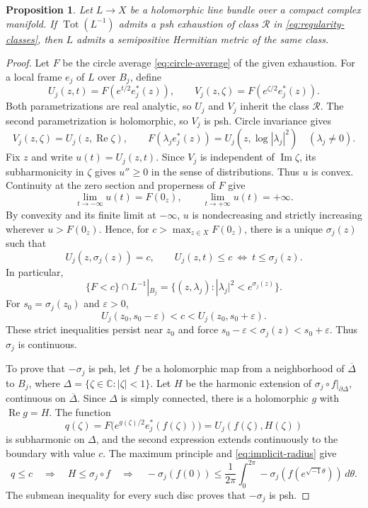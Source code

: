 \documentclass[11pt]{amsart}
\newtheorem{proposition}[theorem]{Proposition}
\theoremstyle{definition}
\theoremstyle{remark}
\numberwithin{equation}{section}
\newcommand{\Tot}{\operatorname{Tot}}
\begin{document}
\begin{proposition}\label{prop:radius}
Let $L\to X$ be a holomorphic line bundle over a compact complex
manifold. If $\Tot(L^{-1})$ admits a psh exhaustion of class
$\mathcal R$ in \eqref{eq:regularity-classes}, then $L$ admits a
semipositive Hermitian metric of the same class.
\end{proposition}
\begin{proof}
Let $F$ be the circle average \eqref{eq:circle-average} of the given
exhaustion. For a local frame $e_j$ of $L$ over $B_j$, define
\[
 U_j(z,t)=F(e^{t/2}e_j^*(z)),\qquad
 V_j(z,\zeta)=F(e^{\zeta/2}e_j^*(z)).
\]
Both parametrizations are real analytic, so $U_j$ and $V_j$
inherit the class $\mathcal R$. The second parametrization is
holomorphic, so $V_j$ is psh. Circle invariance gives
\[
 V_j(z,\zeta)=U_j(z,\operatorname{Re}\zeta),\qquad
 F(\lambda_j e_j^*(z))=U_j(z,\log|\lambda_j|^2)
 \quad(\lambda_j\ne0).
\]
Fix $z$ and write $u(t)=U_j(z,t)$. Since $V_j$ is independent of
$\operatorname{Im}\zeta$, its subharmonicity in $\zeta$ gives
$u''\ge0$ in the sense of distributions. Thus $u$ is convex.
Continuity at the zero section and
properness of $F$ give
\begin{equation}\label{eq:radial-limits}
 \lim_{t\to-\infty}u(t)=F(0_z),\qquad
 \lim_{t\to+\infty}u(t)=+\infty.
\end{equation}
By convexity and its finite limit at $-\infty$, $u$ is
nondecreasing and strictly increasing wherever $u>F(0_z)$.
Hence, for $c>\max_{z\in X}F(0_z)$, there is a unique
$\sigma_j(z)$ such that
\begin{equation}\label{eq:implicit-radius}
 U_j(z,\sigma_j(z))=c,
 \qquad U_j(z,t)\le c\ \Longleftrightarrow\ t\le\sigma_j(z).
\end{equation}
In particular,
\begin{equation}\label{eq:radius-sublevel}
 \{F<c\}\cap L^{-1}|_{B_j}
 =\{(z,\lambda_j):|\lambda_j|^2<e^{\sigma_j(z)}\}.
\end{equation}
For $s_0=\sigma_j(z_0)$ and $\varepsilon>0$,
\[
 U_j(z_0,s_0-\varepsilon)<c<U_j(z_0,s_0+\varepsilon).
\]
These strict inequalities persist near $z_0$ and force
$s_0-\varepsilon<\sigma_j(z)<s_0+\varepsilon$. Thus $\sigma_j$
is continuous.

To prove that $-\sigma_j$ is psh, let $f$ be a holomorphic map from a
neighborhood of $\overline\Delta$ to $B_j$, where $\Delta=\{\zeta\in\mathbb C:|\zeta|< 1\}$. Let $H$ be the harmonic
extension of $\sigma_j\circ f|_{\partial\Delta}$, continuous on
$\overline\Delta$. Since $\Delta$ is simply
connected, there is a holomorphic $g$ with $\operatorname{Re}g=H$.
The function
\[
 q(\zeta)=F\bigl(e^{g(\zeta)/2}e_j^*(f(\zeta))\bigr)
          =U_j(f(\zeta),H(\zeta))
\]
is subharmonic on $\Delta$, and the second expression extends
continuously to the boundary with value $c$. The maximum principle
and \eqref{eq:implicit-radius} give
\[
 q\le c\quad\Longrightarrow\quad
 H\le\sigma_j\circ f\quad\Longrightarrow\quad
 -\sigma_j(f(0))\le\frac1{2\pi}\int_0^{2\pi}
       -\sigma_j(f(e^{\sqrt{-1}\theta}))\,d\theta.
\]
The submean inequality for every such disc proves that $-\sigma_j$ is psh.


\end{proof}
\end{document}
